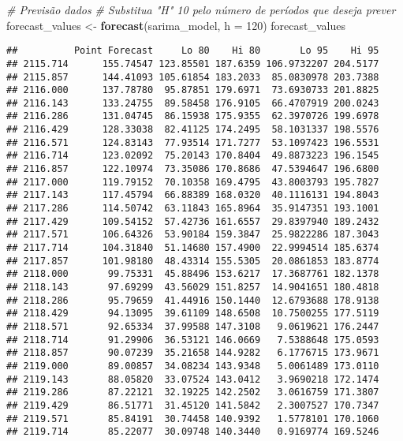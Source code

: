 \documentclass[
]{article}
\newenvironment{Shaded}{\begin{snugshade}}{\end{snugshade}}
\newcommand{\AttributeTok}[1]{\textcolor[rgb]{0.13,0.29,0.53}{#1}}
\newcommand{\CommentTok}[1]{\textcolor[rgb]{0.56,0.35,0.01}{\textit{#1}}}
\newcommand{\DecValTok}[1]{\textcolor[rgb]{0.00,0.00,0.81}{#1}}
\newcommand{\FunctionTok}[1]{\textcolor[rgb]{0.13,0.29,0.53}{\textbf{#1}}}
\newcommand{\NormalTok}[1]{#1}
\newcommand{\OtherTok}[1]{\textcolor[rgb]{0.56,0.35,0.01}{#1}}
\begin{document}
\begin{Shaded}
\begin{Highlighting}[]
\CommentTok{\# Previsão dados}
\CommentTok{\# Substitua "H" 10 pelo número de períodos que deseja prever}
\NormalTok{forecast\_values }\OtherTok{\textless{}{-}} \FunctionTok{forecast}\NormalTok{(sarima\_model, }\AttributeTok{h =} \DecValTok{120}\NormalTok{)  }
\NormalTok{forecast\_values}
\end{Highlighting}
\end{Shaded}

\begin{verbatim}
##          Point Forecast     Lo 80    Hi 80       Lo 95    Hi 95
## 2115.714      155.74547 123.85501 187.6359 106.9732207 204.5177
## 2115.857      144.41093 105.61854 183.2033  85.0830978 203.7388
## 2116.000      137.78780  95.87851 179.6971  73.6930733 201.8825
## 2116.143      133.24755  89.58458 176.9105  66.4707919 200.0243
## 2116.286      131.04745  86.15938 175.9355  62.3970726 199.6978
## 2116.429      128.33038  82.41125 174.2495  58.1031337 198.5576
## 2116.571      124.83143  77.93514 171.7277  53.1097423 196.5531
## 2116.714      123.02092  75.20143 170.8404  49.8873223 196.1545
## 2116.857      122.10974  73.35086 170.8686  47.5394647 196.6800
## 2117.000      119.79152  70.10358 169.4795  43.8003793 195.7827
## 2117.143      117.45794  66.88389 168.0320  40.1116131 194.8043
## 2117.286      114.50742  63.11843 165.8964  35.9147351 193.1001
## 2117.429      109.54152  57.42736 161.6557  29.8397940 189.2432
## 2117.571      106.64326  53.90184 159.3847  25.9822286 187.3043
## 2117.714      104.31840  51.14680 157.4900  22.9994514 185.6374
## 2117.857      101.98180  48.43314 155.5305  20.0861853 183.8774
## 2118.000       99.75331  45.88496 153.6217  17.3687761 182.1378
## 2118.143       97.69299  43.56029 151.8257  14.9041651 180.4818
## 2118.286       95.79659  41.44916 150.1440  12.6793688 178.9138
## 2118.429       94.13095  39.61109 148.6508  10.7500255 177.5119
## 2118.571       92.65334  37.99588 147.3108   9.0619621 176.2447
## 2118.714       91.29906  36.53121 146.0669   7.5388648 175.0593
## 2118.857       90.07239  35.21658 144.9282   6.1776715 173.9671
## 2119.000       89.00857  34.08234 143.9348   5.0061489 173.0110
## 2119.143       88.05820  33.07524 143.0412   3.9690218 172.1474
## 2119.286       87.22121  32.19225 142.2502   3.0616759 171.3807
## 2119.429       86.51771  31.45120 141.5842   2.3007527 170.7347
## 2119.571       85.84191  30.74458 140.9392   1.5778101 170.1060
## 2119.714       85.22077  30.09748 140.3440   0.9169774 169.5246

\end{verbatim}
\end{document}
